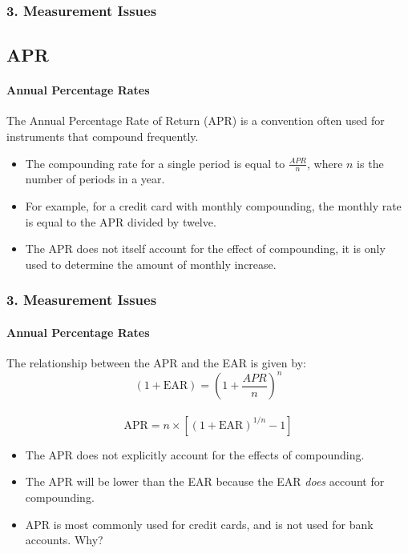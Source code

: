 \documentclass{beamer}
\begin{document}
\begin{frame}[t]
    \frametitle{3. Measurement Issues}
    \subsection{APR}
    \framesubtitle{Annual Percentage Rates}

    The Annual Percentage Rate of Return (APR) is a convention often used for instruments that compound frequently.   \\
    
    \vspace{1em}
    \begin{itemize}
    \item The compounding rate for a single period is equal to $\frac{APR}{n}$, where $n$ is the number of periods in a year. 
    \item For example, for a credit card with monthly compounding, the monthly rate is equal to the APR divided by twelve.
    \item The APR does not itself account for the effect of compounding, it is only used to determine the amount of monthly increase. 
    \end{itemize}
    
\end{frame}

\begin{frame}[t]
    \frametitle{3. Measurement Issues}
    \framesubtitle{Annual Percentage Rates}

    The relationship between the APR and the EAR is given by:\\
    $$(1 + \text{EAR}) = \left(1+\frac{APR}{n}\right)^n$$\\
    $$\text{APR} = n \times [(1+\text{EAR})^{1/n} - 1]$$

    \begin{itemize}
        \item The APR does not explicitly account for the effects of compounding.
        \item The APR will be lower than the EAR because the EAR \textit{does} account for compounding.
        \item APR is most commonly used for credit cards, and is not used for bank accounts.   Why?

    \end{itemize}

\end{frame}
\end{document}
